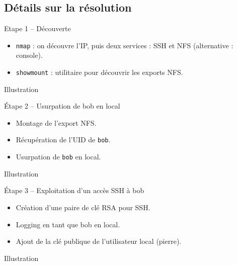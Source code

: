 \documentclass{beamer}
\begin{document}
\subsection{Détails sur la résolution}

\begin{frame}[fragile]
\begin{block}{Etape 1 -- Découverte}
\begin{itemize}
\item \verb+nmap+ : on découvre l'IP, puis deux services : SSH et NFS (alternative : console).
\item \verb+showmount+ : utilitaire pour découvrir les exports NFS.
\end{itemize}
\end{block}
\begin{exampleblock}{Illustration}
\begin{center}
\end{center}
\end{exampleblock}
\end{frame}

\begin{frame}[fragile]
\begin{block}{Étape 2 -- Usurpation de bob en local}
\begin{itemize}
\item Montage de l'export NFS.
\item Récupération de l'UID de \verb+bob+.
\item Usurpation de \verb+bob+ en local.
\end{itemize}
\end{block}
\begin{exampleblock}{Illustration}
\begin{center}
\end{center}
\end{exampleblock}
\end{frame}

\begin{frame}[fragile]
\begin{block}{Étape 3 -- Exploitation d'un accès SSH à bob}
\begin{itemize}
\item Création d'une paire de clé RSA pour SSH.
\item Logging en tant que bob en local.
\item Ajout de la clé publique de l'utilisateur local (pierre).
\end{itemize}
\end{block}
\begin{exampleblock}{Illustration}
\begin{center}
\end{center}
\end{exampleblock}
\end{frame}
\end{document}
